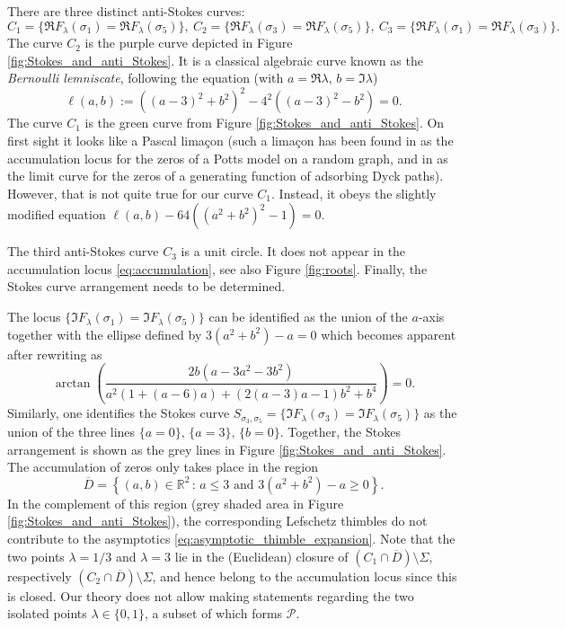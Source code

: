 \documentclass[11pt, a4paper]{article}
\numberwithin{theorem}{section}
\theoremstyle{remark}
\newenvironment{example}
{\pushQED{\qed}\renewcommand{\qedsymbol}{$\diamond$}\examplex}
{\popQED\endexamplex}
\newcommand{\RR}{\mathbb{R}}
\newcommand{\cP}{\mathcal{P}}
\renewcommand{\Re}{\mathfrak{R}}
\renewcommand{\Im}{\mathfrak{I}}
\theoremstyle{theorem}
\begin{document}
\begin{example}
  There are three distinct anti-Stokes curves:
  \[
    C_1 = \{\Re F_{\lambda}(\sigma_1) = \Re F_{\lambda}(\sigma_5)\},~ C_2 = \{\Re F_{\lambda}(\sigma_3) = \Re F_{\lambda}(\sigma_5)\},~ C_3 = \{\Re F_{\lambda}(\sigma_1) = \Re F_{\lambda}(\sigma_3)\}.
  \]
  The curve $C_2$ is the purple curve depicted in Figure \ref{fig:Stokes_and_anti_Stokes}. It is a classical algebraic curve known as the \emph{Bernoulli lemniscate}, following the equation (with $a = \Re \lambda,\, b = \Im\lambda$)
  \[
    \ell(a,b) := ((a-3)^2 + b^2)^2 - 4^2((a-3)^2 - b^2) = 0.
  \]
  The curve $C_1$ is the green curve from Figure \ref{fig:Stokes_and_anti_Stokes}. On first sight it looks like a Pascal lima{\c c}on (such a lima{\c c}on has been found in \cite[\S 6]{dolan2001thin} as the accumulation locus for the zeros of a Potts model on a random graph, and in \cite{beaton2018partition} as the limit curve for the zeros of a generating function of adsorbing Dyck paths). However, that is not quite true for our curve $C_1$. Instead, it obeys the slightly modified equation $\ell(a,b) - 64((a^2 + b^2)^2 - 1) = 0$.\par

  The third anti-Stokes curve $C_3$ is a unit circle. It does not appear in the accumulation locus \eqref{eq:accumulation}, see also Figure \ref{fig:roots}. Finally, the Stokes curve arrangement needs to be determined. \par

  The locus $\{\Im F_{\lambda}(\sigma_1) = \Im F_{\lambda}(\sigma_5)\}$ can be identified as the union of the $a$-axis together with the ellipse defined by $3(a^2 + b^2) - a = 0$ which becomes apparent after rewriting as
  \[
  \arctan\left( \frac{2 b (a - 3 a^2 - 3 b^2)}{a^2 (1 + (a - 6) a) + (2 (a - 3) a - 1) b^2 + b^4} \right) = 0.
  \]
  Similarly, one identifies the Stokes curve $S_{\sigma_3,\sigma_5} = \{\Im F_{\lambda}(\sigma_3) = \Im F_{\lambda}(\sigma_5)\}$ as the union of the three lines $\{a=0\},\,\{a=3\},\,\{b=0\}$. Together, the Stokes arrangement is shown as the grey lines in Figure \ref{fig:Stokes_and_anti_Stokes}. The accumulation of zeros only takes place in the region
  \[
    \overline{D} = \left\{ (a,b)\in\RR^2 \,:\, a \leq 3 \text{ and }  3(a^2 + b^2) - a \geq 0 \right\}.
  \]
  In the complement of this region (grey shaded area in Figure \ref{fig:Stokes_and_anti_Stokes}), the corresponding Lefschetz thimbles do not contribute to the asymptotics \eqref{eq:asymptotic_thimble_expansion}. Note that the two points $\lambda = 1/3$ and $\lambda = 3$ lie in the (Euclidean) closure of $(C_1\cap \overline{D})\setminus \Sigma$, respectively $(C_2\cap \overline{D})\setminus \Sigma$, and hence belong to the accumulation locus since this is closed. 
  Our theory does not allow making statements regarding the two isolated points $\lambda \in \{0,1\}$, a subset of which forms $\cP$.
\end{example}
\end{document}
